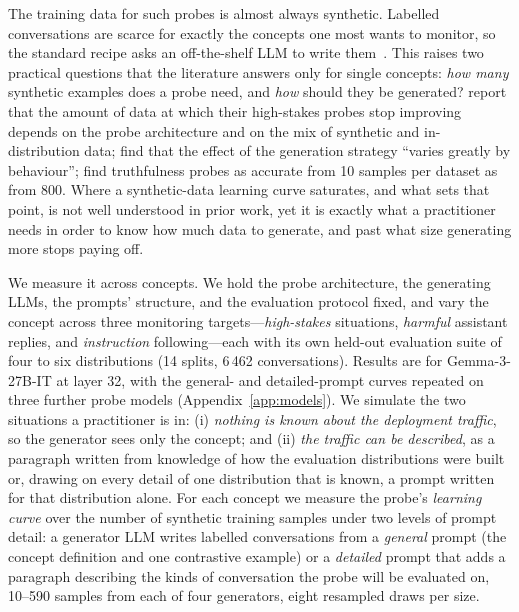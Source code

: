 \documentclass{article} %
\newcommand{\hs}{\emph{high-stakes}}
\newcommand{\harm}{\emph{harmful}}
\newcommand{\instr}{\emph{instruction}}
\begin{document}
The training data for such probes is almost always synthetic. Labelled conversations are scarce for exactly the concepts one most wants to monitor, so the standard recipe asks an off-the-shelf LLM to write them~\citep{mckenzie2025highstakes,kirch2026offpolicy}. This raises two practical questions that the literature answers only for single concepts: \emph{how many} synthetic examples does a probe need, and \emph{how} should they be generated? \citet{mckenzie2025highstakes} report that the amount of data at which their high-stakes probes stop improving depends on the probe architecture and on the mix of synthetic and in-distribution data; \citet{kirch2026offpolicy} find that the effect of the generation strategy ``varies greatly by behaviour''; \citet{liu2024truthfulness} find truthfulness probes as accurate from 10 samples per dataset as from 800. Where a synthetic-data learning curve saturates, and what sets that point, is not well understood in prior work, yet it is exactly what a practitioner needs in order to know how much data to generate, and past what size generating more stops paying off.

We measure it across concepts. We hold the probe architecture, the generating LLMs, the prompts' structure, and the evaluation protocol fixed, and vary the concept across three monitoring targets---\hs{} situations, \harm{} assistant replies, and \instr{} following---each with its own held-out evaluation suite of four to six distributions (14 splits, 6\,462 conversations). Results are for Gemma-3-27B-IT at layer 32, with the general- and detailed-prompt curves repeated on three further probe models (Appendix~\ref{app:models}). We simulate the two situations a practitioner is in: (i) \emph{nothing is known about the deployment traffic}, so the generator sees only the concept; and (ii) \emph{the traffic can be described}, as a paragraph written from knowledge of how the evaluation distributions were built or, drawing on every detail of one distribution that is known, a prompt written for that distribution alone. For each concept we measure the probe's \emph{learning curve} over the number of synthetic training samples under two levels of prompt detail: a generator LLM writes labelled conversations from a \emph{general} prompt (the concept definition and one contrastive example) or a \emph{detailed} prompt that adds a paragraph describing the kinds of conversation the probe will be evaluated on, 10--590 samples from each of four generators, eight resampled draws per size.
\end{document}
